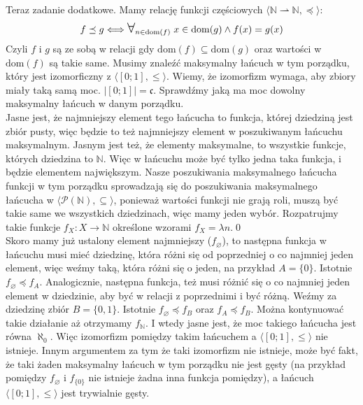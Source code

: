 \documentclass[10pt]{article}
\newcommand{\N}{\mathbb{N}}
\newcommand{\Pows}{\mathcal{P}}
\newcommand{\cont}{\mathfrak{c}}
\newcommand{\Forall}{{\Large\mbox{$\forall$}}}
\begin{document}
Teraz zadanie dodatkowe. Mamy relację funkcji częściowych $\langle\N \rightharpoonup \N, \preceq \rangle$:
$$f \preceq g \Longleftrightarrow \Forall_{n \in \mathrm{dom}(f)} \; x \in \mathrm{dom}(g) \land f(x) = g(x)$$
Czyli $f$ i $g$ są ze sobą w relacji gdy $\mathrm{dom}(f) \subseteq \mathrm{dom}(g)$ oraz wartości w $\mathrm{dom}(f)$ są takie same. Musimy znaleźć maksymalny łańcuch w tym porządku, który jest izomorficzny z $\langle [0; 1], \leq \rangle$. Wiemy, że izomorfizm wymaga, aby zbiory miały taką samą moc. $|[0; 1]| = \cont$. Sprawdźmy jaką ma moc dowolny maksymalny łańcuch w danym porządku. \\[5pt]
Jasne jest, że najmniejszy element tego łańcucha to funkcja, której dziedziną jest zbiór pusty, więc będzie to też najmniejszy element w poszukiwanym łańcuchu maksymalnym. Jasnym jest też, że elementy maksymalne, to wszystkie funkcje, których dziedzina to $\N$. Więc w łańcuchu może być tylko jedna taka funkcja, i będzie elementem największym. Nasze poszukiwania maksymalnego łańcucha funkcji w tym porządku sprowadzają się do poszukiwania maksymalnego łańcucha w $\langle \Pows (\N), \subseteq \rangle$, ponieważ wartości funkcji nie grają roli, muszą być takie same we wszystkich dziedzinach, więc mamy jeden wybór. Rozpatrujmy takie funkcje $f_X \colon X \to \N$ określone wzorami $f_X = \lambda n. \; 0$\\[5pt]
Skoro mamy już ustalony element najmniejszy  ($f_\varnothing$), to następna funkcja w łańcuchu musi mieć dziedzinę, która różni się od poprzedniej o co najmniej jeden element, więc weźmy taką, która różni się o jeden, na przykład $A = \{0 \}$. Istotnie $f_\varnothing \preceq f_A$. Analogicznie, następna funkcja, też musi różnić się o co najmniej jeden element w dziedzinie, aby być w relacji z poprzednimi i być różną. Weźmy za dziedzinę zbiór $B = \{ 0, 1\}$. Istotnie $f_\varnothing \preceq f_B$ oraz $f_A \preceq f_B$. Można kontynuować takie działanie aż otrzymamy $f_\N$. I wtedy jasne jest, że moc takiego łańcucha jest równa $\aleph_0$. Więc izomorfizm pomiędzy takim łańcuchem a $\langle [0; 1], \leq \rangle$ nie istnieje. Innym argumentem za tym że taki izomorfizm nie istnieje, może być fakt, że taki żaden maksymalny łańcuch w tym porządku nie jest gęsty (na przykład pomiędzy $f_\varnothing$ i $f_{\{0\}}$ nie istnieje żadna inna funkcja pomiędzy), a łańcuch $\langle [0; 1], \leq \rangle$ jest trywialnie gęsty.
\end{document}
